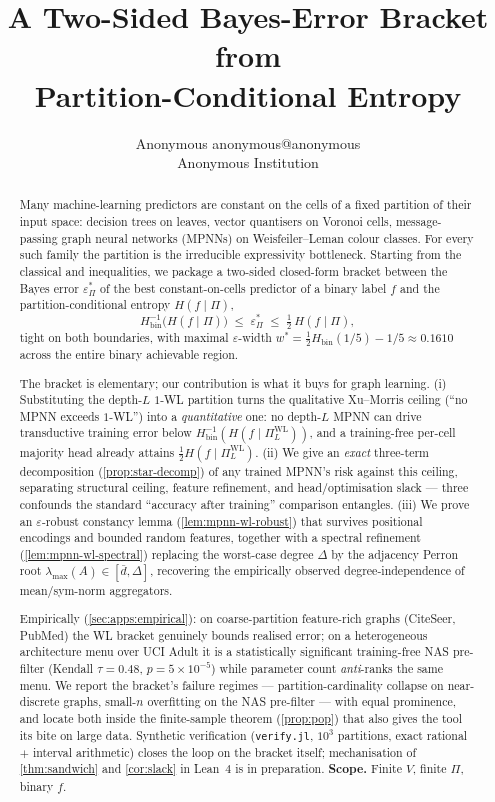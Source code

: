 \documentclass[10pt]{article}
\title{A Two-Sided Bayes-Error Bracket from\\
       Partition-Conditional Entropy}
\author{\name Anonymous \email anonymous@anonymous \\
        \addr Anonymous Institution}
\theoremstyle{definition}
\theoremstyle{remark}
\newcommand{\Hbin}{H_{\mathrm{bin}}}
\newcommand{\Hinv}{H_{\mathrm{bin}}^{-1}}
\newcommand{\eps}{\varepsilon}
\begin{document}
\maketitle

\begin{abstract}
Many machine-learning predictors are constant on the cells of a
fixed partition of their input space: decision trees on leaves,
vector quantisers on Voronoi cells, message-passing graph
neural networks (MPNNs) on Weisfeiler--Leman colour classes.
For every such family the partition is the irreducible
expressivity bottleneck. Starting from the classical
\citet{fano1961} and \citet{hellmanraviv1970} inequalities, we
package a two-sided closed-form bracket between the Bayes error
$\eps^{*}_{\Pi}$ of the best constant-on-cells predictor of a
binary label $f$ and the partition-conditional entropy
$H(f \mid \Pi)$,
\[
  \Hinv\!\bigl(H(f \mid \Pi)\bigr) \;\le\; \eps^{*}_{\Pi}
  \;\le\; \tfrac{1}{2}\, H(f \mid \Pi),
\]
tight on both boundaries, with maximal $\eps$-width
$w^{*} = \tfrac{1}{2}\Hbin(1/5) - 1/5 \approx 0.1610$ across the
entire binary achievable region.

The bracket is elementary; our contribution is what it buys for
graph learning. (i) Substituting the depth-$L$ $1$-WL partition
turns the qualitative Xu--Morris ceiling (``no MPNN exceeds
$1$-WL'') into a \emph{quantitative} one: no depth-$L$ MPNN can
drive transductive training error below
$\Hinv(H(f \mid \Pi^{\mathrm{WL}}_{L}))$, and a training-free
per-cell majority head already attains
$\tfrac{1}{2} H(f \mid \Pi^{\mathrm{WL}}_{L})$. (ii) We give an
\emph{exact} three-term decomposition (\cref{prop:star-decomp})
of any trained MPNN's risk against this ceiling, separating
structural ceiling, feature refinement, and head/optimisation
slack --- three confounds the standard ``accuracy after
training'' comparison entangles. (iii) We prove an
$\varepsilon$-robust constancy lemma (\cref{lem:mpnn-wl-robust})
that survives positional encodings and bounded random features,
together with a spectral refinement
(\cref{lem:mpnn-wl-spectral}) replacing the worst-case degree
$\Delta$ by the adjacency Perron root
$\lambda_{\max}(A) \in [\bar d, \Delta]$, recovering the
empirically observed degree-independence of mean/sym-norm
aggregators.

Empirically (\cref{sec:apps:empirical}): on coarse-partition
feature-rich graphs (CiteSeer, PubMed) the WL bracket genuinely
bounds realised error; on a heterogeneous architecture menu over
UCI Adult it is a statistically significant training-free NAS
pre-filter (Kendall $\tau = 0.48$, $p = 5{\times}10^{-5}$) while
parameter count \emph{anti}-ranks the same menu. We report the
bracket's failure regimes --- partition-cardinality collapse on
near-discrete graphs, small-$n$ overfitting on the NAS
pre-filter --- with equal prominence, and locate both inside the
finite-sample theorem (\cref{prop:pop}) that also gives the tool
its bite on large data. Synthetic verification
(\texttt{verify.jl}, $10^{3}$ partitions, exact rational $+$
interval arithmetic) closes the loop on the bracket itself;
mechanisation of \cref{thm:sandwich} and \cref{cor:slack} in
Lean~$4$ is in preparation. \textbf{Scope.} Finite $V$, finite
$\Pi$, binary $f$.
\end{abstract}
\end{document}
